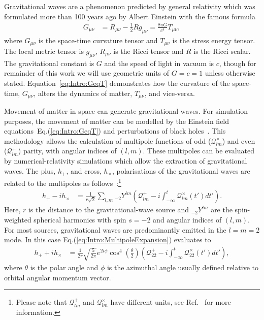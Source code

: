 \documentclass[../Thesis.tex]{subfiles}
\begin{document}
    Gravitational waves are a phenomenon predicted by general relativity which was formulated more than 100 years ago by Albert Einstein with the famous formula
    \begin{align}
        G_{\mu\nu} & = R_{\mu\nu} - \frac{1}{2}R  g_{\mu\nu}  =  \frac{8\pi G}{c^4} T_{\mu\nu}, \label{eq:Intro:GeqT}
    \end{align}
    where $G_{\mu\nu}$ is the space-time curvature tensor and $T_{\mu\nu}$ is the stress energy tensor. The local metric tensor is $g_{\mu\nu}$, $R_{\mu\nu}$ is the Ricci tensor and $R$ is the Ricci scalar. 
    The gravitational constant is $G$ and the speed of light in vacuum is $c$, though for remainder of this work we will use geometric units of $G=c=1$ unless otherwise stated. 
    Equation~\ref{eq:Intro:GeqT} demonstrates how the curvature of the space-time, $G_{\mu\nu}$, alters the dynamics of matter, $T_{\mu\nu}$, and vice-versa. \par
    Movement of matter in space can generate gravitational waves.
    For simulation purposes, the movement of matter can be modelled by the Einstein field equations~Eq.(\ref{eq:Intro:GeqT}) and perturbations of black holes~\cite[e.g.,][]{Moncrief1974,Abrahams1996,Andrade1999,Nagar2005}.
    This methodology allows the calculation of multipole functions of odd ($\mathcal{Q}^\times_{lm}$) and even ($\mathcal{Q}^+_{lm}$) parity, with angular indices of $(l,m)$.
    These multipoles can be evaluated by numerical-relativity simulations which allow the extraction of gravitational waves.
    The plus, $h_{+}$, and cross, $h_{\times}$, polarisations of the gravitational waves are related to the multipoles as follows~\cite{Moncrief1974,Abrahams1996,Andrade1999,Nagar2005,Baiotti2008}:\footnote{Please note that $\mathcal{Q}^+_{lm}$ and $\mathcal{Q}^\times_{lm}$ have different units, see Ref.~\cite{Nagar2005} for more information.}
     \begin{align}
        h_{+} - i h_{\times} & = \frac{1}{r\sqrt{2}}\sum_{l,m} {}_{-2}Y^{lm}\left(\mathcal{Q}^{+}_{lm} -i \int_{-\infty}^t\mathcal{Q}^\times_{lm}(t')dt'\right). \label{eq:Intro:MultipoleExpansion}
    \end{align}   
    Here, $r$ is the distance to the gravitational-wave source and ${}_{-2}Y^{lm}$ are the spin-weighted spherical harmonics with spin $s=-2$ and angular indices of $(l,m)$.
    For most sources, gravitational waves are predominantly emitted in the $l=m=2$ mode. 
    In this case Eq.(\ref{eq:Intro:MultipoleExpansion}) evaluates to
     \begin{align}
        h_{+} + i h_{\times} & = \frac{1}{2 r} \sqrt{\frac{5}{2\pi }} e^{2 i \phi } \cos ^4\left(\frac{\theta }{2}\right)\left(\mathcal{Q}^{+}_{22} -i \int_{-\infty}^t\mathcal{Q}^\times_{22}(t')dt'\right), \label{eq:Intro:MultipoleExpansionlm22}
    \end{align}
    where  $\theta$ is the polar angle and $\phi$ is the azimuthal angle usually defined relative to orbital angular momentum vector. \par
    
\end{document}

